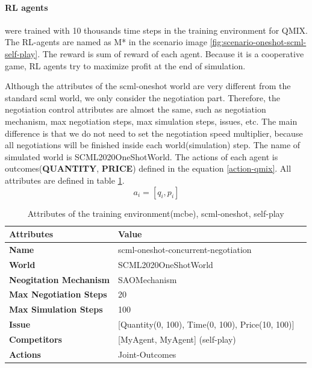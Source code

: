 \paragraph{RL agents} were trained with 10 thousands time steps in the training environment for QMIX. The RL-agents are named as M* in the scenario image \ref{fig:scenario-oneshot-scml-self-play}. The reward is sum of reward of each agent. Because it is a cooperative game, RL agents try to maximize profit at the end of simulation.

Although the attributes of the scml-oneshot world are very different from the standard scml world, we only consider the negotiation part. Therefore, the negotiation control attributes are almost the same, such as negotiation mechanism, max negotiation steps, max simulation steps, issues, etc.
The main difference is that we do not need to set the negotiation speed multiplier, because all negotiations will be finished inside each world(simulation) step. The name of simulated world is SCML2020OneShotWorld. The actions of each agent is outcomes(\textbf{QUANTITY}, \textbf{PRICE}) defined in the equation \ref{action-qmix}. All attributes are defined in table \ref{tab:attributes-mcbe-concurrent-negotiation-scml-oneshot}.
\begin{equation} \label{action-qmix}
a_{i} = [q_i, p_i]
\end{equation}

\begin{table}[htbp]
\centering
\begin{tabular}{l l l} \toprule
\bfseries \textbf{Attributes}    & \bfseries \textbf{Value}                                             \\ \midrule
\textbf{Name}                    & scml-oneshot-concurrent-negotiation                                  \\
\textbf{World}                   & SCML2020OneShotWorld                                                 \\
\textbf{Neogitation Mechanism}   & SAOMechanism                                                         \\
\textbf{Max Negotiation Steps}   & 20                                                                  \\
\textbf{Max Simulation Steps}    & 100                                                                   \\
\textbf{Issue}             	     & [Quantity(0, 100), Time(0, 100), Price(10, 100)]                     \\
\textbf{Competitors}             & [MyAgent, MyAgent] (self-play)                                       \\
\textbf{Actions}                 & Joint-Outcomes                                                             \\
\bottomrule
\end{tabular}
\caption{Attributes of the training environment(mcbe), scml-oneshot, self-play}
\label{tab:attributes-mcbe-concurrent-negotiation-scml-oneshot}
\end{table}

